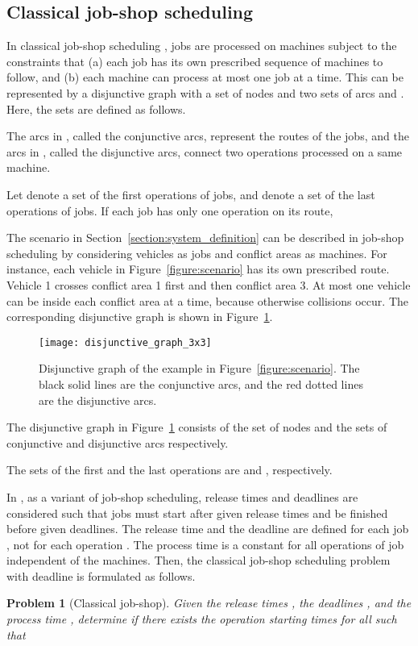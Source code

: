 \documentclass{sig-alternate}
\newtheorem{problem}{Problem}
\begin{document}
\subsection{Classical job-shop scheduling}\label{section:classical_job-shop}
In classical job-shop scheduling \cite{pinedo_scheduling_2012},  jobs are processed on  machines subject to the constraints that (a) each job has its own prescribed sequence of machines to follow, and (b) each machine can process at most one job at a time. 
This can be represented by a disjunctive graph with a set of nodes  and two sets of arcs  and . Here, the sets are defined as follows.

The arcs in , called the conjunctive arcs, represent the routes of the jobs, and the arcs in , called the disjunctive arcs, connect two operations processed on a same machine. 

Let  denote a set of the first operations of jobs, and  denote a set of the last operations of jobs. If each job has only one operation on its route,  


The scenario in Section~\ref{section:system_definition} can be described in job-shop scheduling by considering vehicles as jobs and conflict areas as machines. For instance, each vehicle in Figure~\ref{figure:scenario} has its own prescribed route. Vehicle 1 crosses conflict area 1 first and then conflict area 3. At most one vehicle can be inside each conflict area at a time, because otherwise collisions occur. The corresponding disjunctive graph is shown in Figure~\ref{figure:disjunctiveGraph}.

\begin{figure}[t]
	\centering
	\texttt{[image: disjunctive\_graph\_3x3]}
	\caption{Disjunctive graph of the example in Figure~\ref{figure:scenario}. The black solid lines are the conjunctive arcs, and the red dotted lines are the disjunctive arcs.}
	\label{figure:disjunctiveGraph}
\end{figure}

\begin{example}
	The disjunctive graph in Figure~\ref{figure:disjunctiveGraph} consists of the set of nodes  and the sets of conjunctive and disjunctive arcs
	respectively. 
	
	The sets of the first and the last operations are 	 and , respectively.
	
\end{example}


In \cite{balas_job_1998}, as a variant of job-shop scheduling, release times and deadlines are considered such that jobs must start after given release times and be finished before given deadlines. The release time  and the deadline  are defined for each job , not for each operation . The process time  is a constant for all operations of job  independent of the machines. Then, the classical job-shop scheduling problem with deadline is formulated as follows.
\begin{problem}[Classical job-shop]\label{problem:classical_jobshop}
	Given the release times , the deadlines , and the process time , determine if there exists the operation starting times  for all  such that
	
\end{problem}
\end{document}
